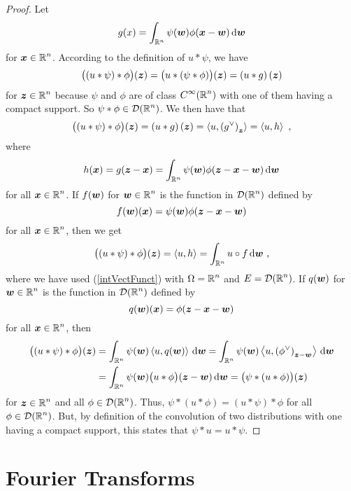 \begin{proof}
Let
\[
g(x) = \int_{\mathbb{R}^n} \psi({\bm{w}}) \phi({\bm{x}} - {\bm{w}}) \,\mathrm{d}{{\bm{w}}}
\]
for $\displaystyle {\bm{x}} \in \mathbb{R}^n$.  According to the definition of
$u \ast \psi$, we have
\[
\big( (u\ast \psi) \ast \phi \big)({\bm{z}})
= \big( u \ast ( \psi \ast \phi) \big)({\bm{z}})
= \left( u \ast g \right)({\bm{z}})
\]
for $\displaystyle {\bm{z}} \in \mathbb{R}^n$ because $\psi$ and $\phi$ are of class
$\displaystyle C^\infty(\mathbb{R}^n)$ with one of them having a compact support.
So $\displaystyle \psi \ast \phi \in \mathcal{D}(\mathbb{R}^n)$.
We then have that
\[
\big( (u\ast \psi) \ast \phi \big)({\bm{z}})
= \left( u \ast g \right)({\bm{z}})
= \left\langle{u} , { \left(g^\vee\right)_{{\bm{z}}}}\right\rangle
= \left\langle{u} , {h}\right\rangle \ ,
\]
where
\[
h({\bm{x}}) = g({\bm{z}}- {\bm{x}})
= \int_{\mathbb{R}^n} \psi({\bm{w}}) \phi({\bm{z}} - {\bm{x}} - {\bm{w}}) \,\mathrm{d}{{\bm{w}}}
\]
for all $\displaystyle {\bm{x}} \in \mathbb{R}^n$.  If $\displaystyle f({\bm{w}})$ for
$\displaystyle {\bm{w}} \in \mathbb{R}^n$ is the function in $\displaystyle \mathcal{D}(\mathbb{R}^n)$
defined by
\[
f({\bm{w}})({\bm{x}}) = \psi({\bm{w}}) \phi({\bm{z}} - {\bm{x}} - {\bm{w}})
\]
for all $\displaystyle {\bm{x}} \in \mathbb{R}^n$, then we get
\[
\big( (u\ast \psi) \ast \phi \big)({\bm{z}}) = \left\langle{u} , {h}\right\rangle
= \int_{\mathbb{R}^n} u \circ f \,\mathrm{d}{{\bm{w}}} \ ,
\]
where we have used (\ref{intVectFunct}) with
$\displaystyle \Omega = \mathbb{R}^n$ and $\displaystyle E = \mathcal{D}(\mathbb{R}^n)$.
If $\displaystyle q({\bm{w}})$ for
$\displaystyle {\bm{w}} \in \mathbb{R}^n$ is the function in $\displaystyle \mathcal{D}(\mathbb{R}^n)$
defined by
\[
q({\bm{w}})({\bm{x}}) = \phi({\bm{z}} - {\bm{x}} - {\bm{w}})
\]
for all $\displaystyle {\bm{x}} \in \mathbb{R}^n$, then
\begin{align*}
\big( (u\ast \psi) \ast \phi \big)({\bm{z}}) 
& = \int_{\mathbb{R}^n} \psi({\bm{w}}) \left\langle{u} , {q({\bm{w}})}\right\rangle \,\mathrm{d}{{\bm{w}}}
= \int_{\mathbb{R}^n} \psi({\bm{w}})
\left\langle{u} , {\left(\phi^\vee\right)_{{\bm{z}}-{\bm{w}}}}\right\rangle \,\mathrm{d}{{\bm{w}}} \\
&= \int_{\mathbb{R}^n} \psi({\bm{w}}) \big( u \ast \phi \big)({\bm{z}} - {\bm{w}})
\,\mathrm{d}{{\bm{w}}}
= \big( \psi \ast (u \ast \phi) \big)({\bm{z}})
\end{align*}
for $\displaystyle {\bm{z}} \in \mathbb{R}^n$ and all
$\displaystyle \phi \in \mathcal{D}(\mathbb{R}^n)$.  Thus,
$\psi \ast (u \ast \phi) = (u\ast \psi) \ast \phi$ for all
$\displaystyle \phi \in \mathcal{D}(\mathbb{R}^n)$.  But, by definition of the
convolution of two distributions with one having a compact support,
this states that $\psi \ast u = u\ast \psi$.  
\end{proof}

\section{Fourier Transforms} \label{sectionFT}

